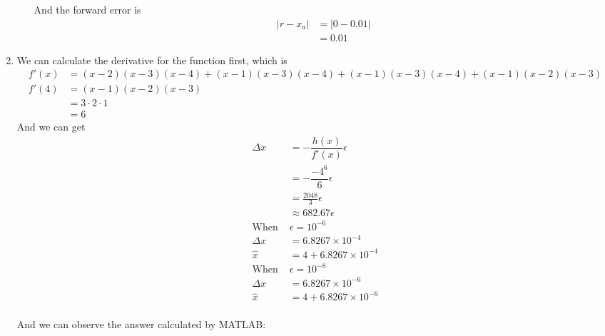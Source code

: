 \documentclass{article}
\begin{document}
\begin{enumerate}
\begin{enumerate}
And the forward error is \begin{align*}
|r-x_a|&= |0-0.01|\\&= 0.01	
\end{align*}
\end{enumerate}

\item
We can calculate the derivative for the function first, which is \begin{align*}
f'(x) &= (x-2)(x-3)(x-4)+(x-1)(x-3)(x-4)+(x-1)(x-3)(x-4)+(x-1)(x-2)(x-3)\\
f'(4) &= (x-1)(x-2)(x-3)\\
&= 3\cdot 2\cdot 1\\
&=6
\end{align*}
And we can get \begin{align*}
\Delta x &= -\dfrac{h(x)}{f'(x)}\epsilon\\
&=-\dfrac{-4^6}{6}\epsilon\\
&=\frac{2048}{3}\epsilon\\
&\approx 682.67 \epsilon\\
\mbox{When }& \epsilon =10^{-6}\\
\Delta x &=6.8267\times 10^{-4}\\
\hat{x} &= 4+6.8267\times 10^{-4}\\
\mbox{When }& \epsilon =10^{-8}\\
\Delta x &=6.8267\times 10^{-6}\\
\hat{x} &= 4+6.8267\times 10^{-6}\\
\end{align*}

And we can observe the answer calculated by MATLAB:

\end{enumerate}
\end{document}
